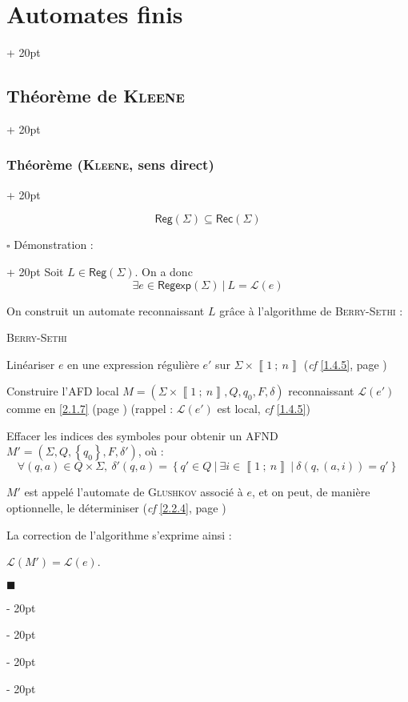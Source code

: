 \documentclass[a4paper, 12pt, twoside]{article}
\newenvironment{indalgo}[2][H]{
    \begin{algoBox}
        \begin{algorithm}[#1]
            \caption{#2}
}
{
        \end{algorithm}
    \end{algoBox}
}
\newcommand{\nset}[2]{\left\llbracket #1\ ;\ #2 \right\rrbracket}
\newcommand{\lr}[1]{\left( #1 \right)}
\newcommand{\set}[1]{\left\{ #1 \right\}}
\newcommand{\ind}[1][20pt]{\advance\leftskip + #1}
\newcommand{\deind}[1][20pt]{\advance\leftskip - #1}
\newenvironment{indt}[2][20pt]{#2 \par \ind[#1]}{\par \deind} %
\newenvironment{proof}[1][{Démonstration :}]{\begin{indt}{$\square$ #1}}{$\blacksquare$ \end{indt}}
\newcommand{\Reg}{\mathsf{Reg}}
\newcommand{\Regexp}{\mathsf{Regexp}}
\newcommand{\Rec}[1]{\mathsf{Rec}\!\lr{#1}}
\begin{document}
\begin{indt}{\section{Automates finis}}
\begin{indt}{\subsection{Théorème de \textsc{Kleene}}}
\begin{indt}{\subsubsection{Théorème (\textsc{Kleene}, sens direct)}}
\begin{emphBox}
                    \[
                        \Reg(\Sigma) \subseteq \Rec \Sigma
                    \]
                \end{emphBox}

                \vspace{6pt}
                
                \begin{proof}
                    Soit $L \in \Reg(\Sigma)$. On a donc
                    \[
                        \exists e \in \Regexp(\Sigma)\ |\ L = \mathcal L(e)
                    \]

                    On construit un automate reconnaissant $L$ grâce à l'algorithme de \textsc{Berry-Sethi} :

                    \vspace{6pt}
                    
                    \begin{indalgo}{\textsc{Berry-Sethi}}
                        \label{alg:3}

                        Linéariser $e$ en une expression régulière $e'$ sur $\Sigma \times \nset 1 n$ (\textit{cf} \ref{1.4.5}, page \pageref{1.4.5})\;

                        Construire l'AFD local $M = (\Sigma \times \nset 1 n, Q, q_0, F, \delta)$ reconnaissant $\mathcal L(e')$ comme en \ref{2.1.7} (page \pageref{2.1.7})
                        (rappel : $\mathcal L(e')$ est local, \textit{cf} \ref{1.4.5})\;

                        Effacer les indices des symboles pour obtenir un AFND $M' = (\Sigma, Q, \set{q_0}, F, \delta')$, où :
                        \[
                            \forall (q, a) \in Q \times \Sigma,\
                            \delta'(q, a) = \set{q' \in Q\ |\ \exists i \in \nset 1 n\ |\ \delta(q, (a, i)) = q'}
                        \]
                    \end{indalgo}

                    \vspace{6pt}
                    
                    $M'$ est appelé l'automate de \textsc{Glushkov} associé à $e$, et on peut, de manière optionnelle, le déterminiser (\textit{cf} \ref{2.2.4}, page \pageref{2.2.4})

                    La correction de l'algorithme s'exprime ainsi :

                    $\mathcal L(M') = \mathcal L(e)$.


\end{proof}
\end{indt}
\end{indt}
\end{indt}
\end{document}
